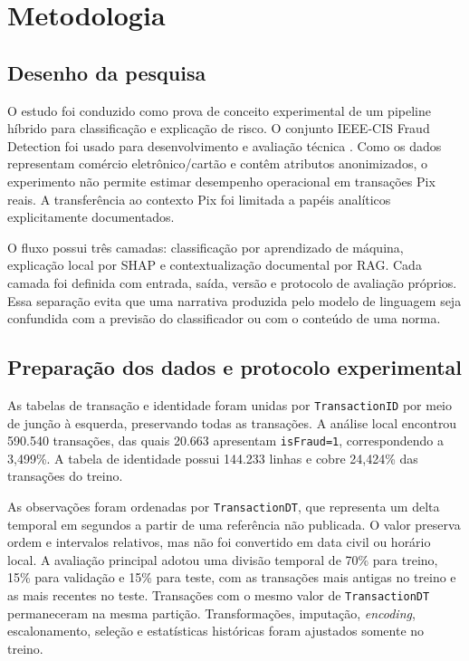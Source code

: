\chapter{Metodologia}

\section{Desenho da pesquisa}

O estudo foi conduzido como prova de conceito experimental de um pipeline híbrido para classificação e explicação de risco. O conjunto IEEE-CIS Fraud Detection foi usado para desenvolvimento e avaliação técnica \cite{ieee_cis_2019}. Como os dados representam comércio eletrônico/cartão e contêm atributos anonimizados, o experimento não permite estimar desempenho operacional em transações Pix reais. A transferência ao contexto Pix foi limitada a papéis analíticos explicitamente documentados.

O fluxo possui três camadas: classificação por aprendizado de máquina, explicação local por SHAP e contextualização documental por RAG. Cada camada foi definida com entrada, saída, versão e protocolo de avaliação próprios. Essa separação evita que uma narrativa produzida pelo modelo de linguagem seja confundida com a previsão do classificador ou com o conteúdo de uma norma.

\section{Preparação dos dados e protocolo experimental}

As tabelas de transação e identidade foram unidas por \texttt{TransactionID} por meio de junção à esquerda, preservando todas as transações. A análise local encontrou 590.540 transações, das quais 20.663 apresentam \texttt{isFraud=1}, correspondendo a 3,499\%. A tabela de identidade possui 144.233 linhas e cobre 24,424\% das transações do treino.

As observações foram ordenadas por \texttt{TransactionDT}, que representa um delta temporal em segundos a partir de uma referência não publicada. O valor preserva ordem e intervalos relativos, mas não foi convertido em data civil ou horário local. A avaliação principal adotou uma divisão temporal de 70\% para treino, 15\% para validação e 15\% para teste, com as transações mais antigas no treino e as mais recentes no teste. Transações com o mesmo valor de \texttt{TransactionDT} permaneceram na mesma partição. Transformações, imputação, \emph{encoding}, escalonamento, seleção e estatísticas históricas foram ajustados somente no treino.

